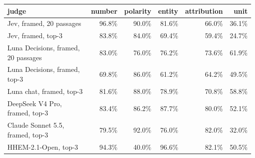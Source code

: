 \begin{tabular}{lrrrrr}
\toprule
judge & number & polarity & entity & attribution & unit \\
\midrule
Jev, framed, 20 passages & 96.8\% & 90.0\% & 81.6\% & 66.0\% & 36.1\% \\
Jev, framed, top-3 & 83.8\% & 84.0\% & 69.4\% & 59.4\% & 24.7\% \\
Luna Decisions, framed, 20 passages & 83.0\% & 76.0\% & 76.2\% & 73.6\% & 61.9\% \\
Luna Decisions, framed, top-3 & 69.8\% & 86.0\% & 61.2\% & 64.2\% & 49.5\% \\
Luna chat, framed, top-3 & 81.6\% & 88.0\% & 78.9\% & 70.8\% & 58.8\% \\
DeepSeek V4 Pro, framed, top-3 & 83.4\% & 86.2\% & 87.7\% & 80.0\% & 52.1\% \\
Claude Sonnet 5.5, framed, top-3 & 79.5\% & 92.0\% & 76.0\% & 82.0\% & 32.0\% \\
HHEM-2.1-Open, top-3 & 94.3\% & 40.0\% & 96.6\% & 82.1\% & 50.5\% \\
\bottomrule
\end{tabular}
